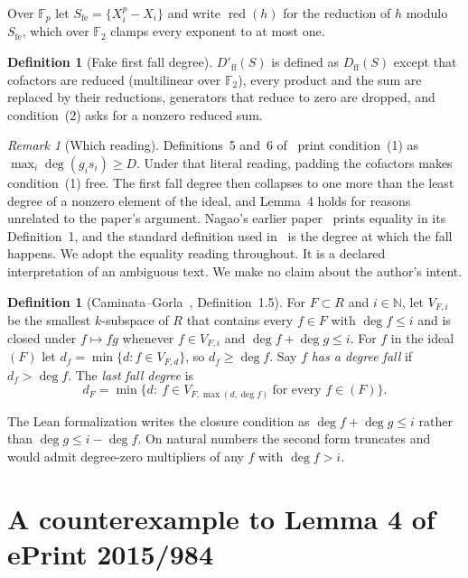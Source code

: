 \documentclass[11pt,a4paper]{article}
\theoremstyle{plain}
\theoremstyle{definition}
\newtheorem{definition}[theorem]{Definition}
\theoremstyle{remark}
\newtheorem{remark}[theorem]{Remark}
\newcommand{\FF}{\mathbb{F}}
\newcommand{\Sfe}{S_{\mathrm{fe}}}
\newcommand{\Dff}{D_{\mathrm{ff}}}
\newcommand{\Dfake}{D'_{\mathrm{ff}}}
\newcommand{\red}{\operatorname{red}}
\begin{document}
Over $\FF_p$ let $\Sfe=\{X_i^p-X_i\}$ and write $\red(h)$ for the reduction of
$h$ modulo $\Sfe$, which over $\FF_2$ clamps every exponent to at most one.

\begin{definition}[Fake first fall degree]\label{def:fake}
$\Dfake(S)$ is defined as $\Dff(S)$ except that cofactors are reduced
(multilinear over $\FF_2$), every product and the sum are replaced by their
reductions, generators that reduce to zero are dropped, and condition~(2)
asks for a nonzero reduced sum.
\end{definition}

\begin{remark}[Which reading]\label{rem:reading}
Definitions~5 and~6 of~\cite{nagao15} print condition~(1) as
$\max_i\deg(g_is_i)\ge D$. Under that literal reading, padding the cofactors
makes condition~(1) free. The first fall degree then collapses to one more
than the least degree of a nonzero element of the ideal, and Lemma~4 holds
for reasons unrelated to the paper's argument. Nagao's earlier paper~\cite{nagao13} prints
equality in its Definition~1, and the standard definition used
in~\cite{cg} is the degree at which the fall happens. We adopt the equality
reading throughout. It is a declared interpretation of an ambiguous text. We
make no claim about the author's intent.
\end{remark}

\begin{definition}[Caminata--Gorla~\cite{cg}, Definition~1.5]\label{def:V}
For $F\subset R$ and $i\in\mathbb N$, let $V_{F,i}$ be the smallest
$k$-subspace of $R$ that contains every $f\in F$ with $\deg f\le i$ and is
closed under $f\mapsto fg$ whenever $f\in V_{F,i}$ and
$\deg f+\deg g\le i$. For $f$ in the ideal $(F)$ let
$d_f=\min\{d: f\in V_{F,d}\}$, so $d_f\ge\deg f$. Say $f$ \emph{has a degree
fall} if $d_f>\deg f$. The \emph{last fall degree} is
\[
d_F=\min\{d:\ f\in V_{F,\max(d,\deg f)}\ \text{for every } f\in(F)\}.
\]
\end{definition}

The Lean formalization writes the closure condition as
$\deg f+\deg g\le i$ rather than $\deg g\le i-\deg f$. On natural numbers the
second form truncates and would admit degree-zero multipliers of any $f$ with
$\deg f>i$.

\section{A counterexample to Lemma 4 of ePrint 2015/984}\label{sec:nagao}
\end{document}

